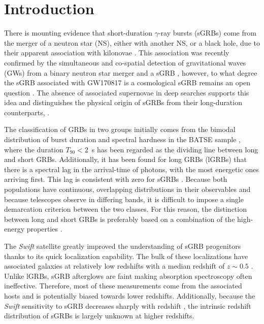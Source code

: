 \documentclass[referee]{aa}
\begin{document}
\section{Introduction}

There is mounting evidence that short-duration $\gamma$-ray bursts (sGRBs) come
from the merger of a neutron star (NS), either with another NS, or a black hole,
due to their apparent association with kilonovae \citep{Barnes2013a,
	Tanvir2013b, Berger2013b, Yang2015, Jin2016, Rosswog2016}. This association was
recently confirmed by the simultaneous and co-spatial detection of gravitational
waves (GWs) from a binary neutron star merger and a sGRB
\citep{LIGOScientificCollaboration2017a, Goldstein2017, Savchenko2017}, however,
to what degree the sGRB associated with GW170817 is a cosmological sGRB remains
an open question \citep{Lyman2018, Margutti2018}. The absence of associated
supernovae in deep searches \citep[e.g.][]{Hjorth2005a,Fox2005,Hjorth2005b,
	Kann2011} supports this idea and distinguishes the physical origin of sGRBs from
their long-duration counterparts, \citep[albeit see also][]{Fynbo2006b,
	Valle2006, Gal-Yam2006}.

The classification of GRBs in two groups initially comes from the bimodal
distribution of burst duration and spectral hardness in the BATSE sample \citep{Kouveliotou1993},
where the duration $T_{90} < 2$~s has been regarded as the dividing line between long
and short GRBs. Additionally, it has been found for long GRBs (lGRBs) that there is a
spectral lag in the arrival-time of photons, with the most energetic ones
arriving first. This lag is consistent with zero for sGRBs
\citep{Norris2006}. Because both populations have continuous, overlapping
distributions in their observables and because telescopes observe in differing
bands, it is difficult to impose a single demarcation criterion between the two
classes. For this reason, the distinction between long and short GRBs is
preferably based on a combination of the high-energy properties \citep{Zhang2009,
	Kann2011, Bromberg2012a, Bromberg2013}.

The \textit{Swift} satellite \citep{Gehrels2004} greatly improved the
understanding of sGRB progenitors thanks to its quick localization capability.
The bulk of these localizations have associated galaxies at relatively low
redshifts with a median redshift of $z\sim0.5$ \citep{Berger2014}. Unlike lGRBs,
sGRB afterglows are faint making absorption spectroscopy often ineffective.
Therefore, most of these measurements come from the associated hosts and is
potentially biased towards lower redshifts. Additionally, because the
\textit{Swift} sensitivity to sGRB decreases sharply with redshift
\citep{Behroozi2014}, the intrinsic redshift distribution of sGRBs is largely
unknown at higher redshifts.
\end{document}
